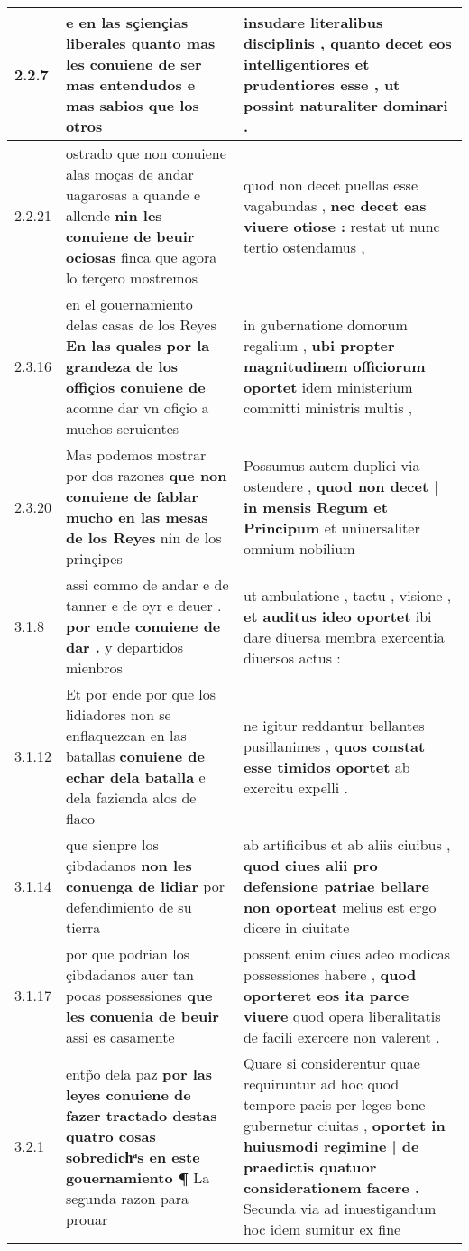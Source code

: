 \begin{tabular}{|p{1cm}|p{6.5cm}|p{6.5cm}|}
2.2.7 & e en las sçiençias liberales \textbf{ quanto mas les conuiene de ser mas entendudos } e mas sabios que los otros & insudare literalibus disciplinis , \textbf{ quanto decet eos intelligentiores et prudentiores esse , } ut possint naturaliter dominari . \\\hline
2.2.21 & ostrado que non conuiene alas moças de andar uagarosas a quande e allende \textbf{ nin les conuiene de beuir ociosas } finca que agora lo terçero mostremos & quod non decet puellas esse vagabundas , \textbf{ nec decet eas viuere otiose : } restat ut nunc tertio ostendamus , \\\hline
2.3.16 & en el gouernamiento delas casas de los Reyes \textbf{ En las quales por la grandeza de los offiçios conuiene de } acomne dar vn ofiçio a muchos seruientes & in gubernatione domorum regalium , \textbf{ ubi propter magnitudinem officiorum oportet } idem ministerium committi ministris multis , \\\hline
2.3.20 & Mas podemos mostrar por dos razones \textbf{ que non conuiene de fablar mucho en las mesas de los Reyes } nin de los prinçipes & Possumus autem duplici via ostendere , \textbf{ quod non decet | in mensis Regum et Principum } et uniuersaliter omnium nobilium \\\hline
3.1.8 & assi commo de andar e de tanner e de oyr e deuer . \textbf{ por ende conuiene de dar . } y departidos mienbros & ut ambulatione , tactu , visione , \textbf{ et auditus ideo oportet } ibi dare diuersa membra exercentia diuersos actus : \\\hline
3.1.12 & Et por ende por que los lidiadores non se enflaquezcan en las batallas \textbf{ conuiene de echar dela batalla } e dela fazienda alos de flaco & ne igitur reddantur bellantes pusillanimes , \textbf{ quos constat esse timidos oportet } ab exercitu expelli . \\\hline
3.1.14 & que sienpre los çibdadanos \textbf{ non les conuenga de lidiar } por defendimiento de su tierra & ab artificibus et ab aliis ciuibus , \textbf{ quod ciues alii pro defensione patriae bellare non oporteat } melius est ergo dicere in ciuitate \\\hline
3.1.17 & por que podrian los çibdadanos auer tan pocas possessiones \textbf{ que les conuenia de beuir } assi es casamente & possent enim ciues adeo modicas possessiones habere , \textbf{ quod oporteret eos ita parce viuere } quod opera liberalitatis de facili exercere non valerent . \\\hline
3.2.1 & entp̃o dela paz \textbf{ por las leyes conuiene de fazer tractado destas quatro cosas sobredichͣs en este gouernamiento ¶ } La segunda razon para prouar & Quare si considerentur quae requiruntur ad hoc quod tempore pacis per leges bene gubernetur ciuitas , \textbf{ oportet in huiusmodi regimine | de praedictis quatuor considerationem facere . } Secunda via ad inuestigandum hoc idem sumitur ex fine \\\hline

\end{tabular}
